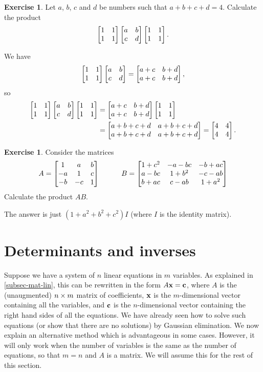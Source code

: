 \documentclass[a4paper]{book}
\theoremstyle{definition}
\newtheorem{exercise}[theorem]{Exercise}
\renewenvironment{solution}{\SolutionInline}{\endSolutionInline}
\begin{document}
\begin{exercise}
 Let $a$, $b$, $c$ and $d$ be numbers such that $a+b+c+d=4$.
 Calculate the product
 \[ \begin{bmatrix} 1&1\\1&1\end{bmatrix} \begin{bmatrix} a&b\\c&d\end{bmatrix} \begin{bmatrix} 1&1\\1&1\end{bmatrix}. \]
\end{exercise}
\begin{solution}
 We have 
 \[ \begin{bmatrix} 1&1\\1&1\end{bmatrix} \begin{bmatrix} a&b\\c&d\end{bmatrix} = 
     \begin{bmatrix} a+c&b+d\\a+c&b+d\end{bmatrix}, 
 \]
 so 
 \begin{align*}
  \begin{bmatrix} 1&1\\1&1\end{bmatrix} \begin{bmatrix} a&b\\c&d\end{bmatrix}\begin{bmatrix} 1&1\\1&1\end{bmatrix} 
   &= \begin{bmatrix} a+c&b+d\\a+c&b+d\end{bmatrix}\begin{bmatrix} 1&1\\1&1\end{bmatrix} \\
   &= \begin{bmatrix} a+b+c+d & a+b+c+d \\ 
           a+b+c+d & a+b+c+d \end{bmatrix} = \begin{bmatrix} 4&4\\4&4 \end{bmatrix}.
 \end{align*}
\end{solution}

\begin{exercise}
 Consider the matrices
 \[ A = \begin{bmatrix}
          1   & a   & b   \\
          -a  & 1   & c   \\
          -b  & -c  & 1
        \end{bmatrix}
    \hspace{3em}
    B = \begin{bmatrix}
          1+c^2 & -a-bc & -b+ac \\
          a-bc  & 1+b^2 & -c-ab \\
          b+ac  & c-ab  & 1+a^2
        \end{bmatrix}
 \]
 Calculate the product $AB$.
\end{exercise}
\begin{solution}
 The answer is just $(1+a^2+b^2+c^2)I$ (where $I$ is the identity
 matrix).
\end{solution}


\section{Determinants and inverses}
\label{sec-det}

Suppose we have a system of $n$ linear equations in $m$ variables.  As
explained in \autoref{subsec-mat-lin}, this can be rewritten in the
form $A\mathbf{x}=\mathbf{c}$, where $A$ is the (unaugmented) $n\times m$
matrix of coefficients, $\mathbf{x}$ is the $m$-dimensional vector
containing all the variables, and $\mathbf{c}$ is the $n$-dimensional
vector containing the right hand sides of all the equations.  We have
already seen how to solve such equations (or show that there are no
solutions) by Gaussian elimination.  We now explain an alternative
method which is advantageous in some cases.  However, it will only
work when the number of variables is the same as the number of
equations, so that $m=n$ and $A$ is a  matrix.  We will
assume this for the rest of this section.
\end{document}

